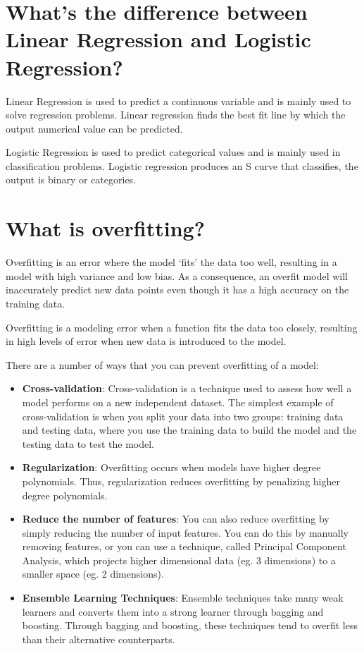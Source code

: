 \documentclass[
]{book}
\begin{document}
\hypertarget{whats-the-difference-between-linear-regression-and-logistic-regression}{%
\section{What's the difference between Linear Regression and Logistic Regression?}\label{whats-the-difference-between-linear-regression-and-logistic-regression}}

Linear Regression is used to predict a continuous variable and is mainly used to solve regression problems. Linear regression finds the best fit line by which the output numerical value can be predicted.

Logistic Regression is used to predict categorical values and is mainly used in classification problems. Logistic regression produces an S curve that classifies, the output is binary or categories.

\hypertarget{what-is-overfitting}{%
\section{What is overfitting?}\label{what-is-overfitting}}

Overfitting is an error where the model `fits' the data too well, resulting in a model with high variance and low bias. As a consequence, an overfit model will inaccurately predict new data points even though it has a high accuracy on the training data.

Overfitting is a modeling error when a function fits the data too closely, resulting in high levels of error when new data is introduced to the model.

There are a number of ways that you can prevent overfitting of a model:

\begin{itemize}
\item
  \textbf{Cross-validation}: Cross-validation is a technique used to assess how well a model performs on a new independent dataset. The simplest example of cross-validation is when you split your data into two groups: training data and testing data, where you use the training data to build the model and the testing data to test the model.
\item
  \textbf{Regularization}: Overfitting occurs when models have higher degree polynomials. Thus, regularization reduces overfitting by penalizing higher degree polynomials.
\item
  \textbf{Reduce the number of features}: You can also reduce overfitting by simply reducing the number of input features. You can do this by manually removing features, or you can use a technique, called Principal Component Analysis, which projects higher dimensional data (eg. 3 dimensions) to a smaller space (eg. 2 dimensions).
\item
  \textbf{Ensemble Learning Techniques}: Ensemble techniques take many weak learners and converts them into a strong learner through bagging and boosting. Through bagging and boosting, these techniques tend to overfit less than their alternative counterparts.
\end{itemize}
\end{document}
